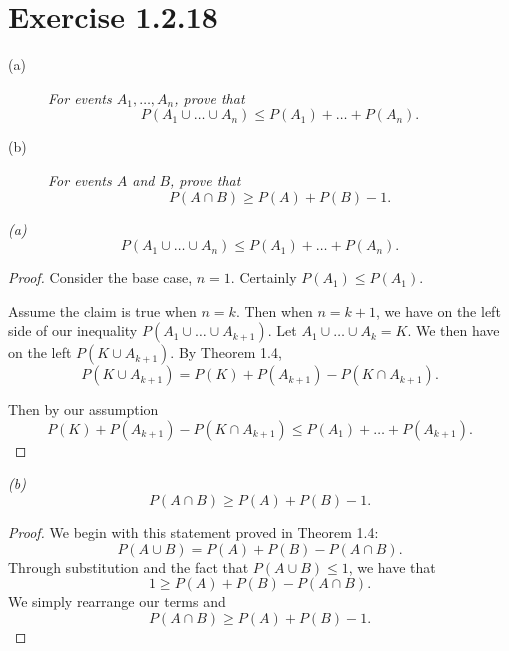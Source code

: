 \documentclass{tufte-handout}
\begin{document}
\section{Exercise 1.2.18}

\begin{description}
\item[(a)] \textit{For events $A_1,\dots, A_n$, prove that
  \[
  P(A_1 \cup \dots \cup A_n) \leq P(A_1) + \dots + P(A_n).
  \]}
\item[(b)] \textit{For events $A$ and $B$, prove that
  \[
  P(A \cap B) \geq P(A) + P(B) - 1.
  \]}
\end{description}

\begin{description}
  \begin{samepage}
  \item[\emph{(a)}]
    \[
    P(A_1 \cup \dots \cup A_n) \leq P(A_1) + \dots + P(A_n).
    \]

    \begin{proof}
      Consider the base case, $n = 1$. Certainly $P(A_1) \leq P(A_1)$.

      Assume the claim is true when $n = k$. Then when $n = k + 1$, we
      have on the left side of our inequality
      $P(A_1 \cup \dots \cup A_{k + 1})$. Let
      $A_1 \cup \dots \cup A_k = K$. We then have on the left
      $P(K \cup A_{k+1})$. By Theorem 1.4, \[ P(K \cup A_{k+1}) = P(K)
      + P(A_{k +1}) - P(K \cap A_{k+1}).\]

      Then by our assumption \[P(K) + P(A_{k+1}) - P(K \cap A_{k+1})
      \leq P(A_1) + \dots + P(A_{k+1}).\]
    \end{proof}
  \end{samepage}

  \begin{samepage}
  \item[\emph{(b)}]
    \[P(A \cap B) \geq P(A) + P(B) - 1.\]

    \begin{proof}
      We begin with this statement proved in Theorem 1.4:
      \[P(A \cup B) = P(A) + P(B) - P(A \cap B).\]
      Through substitution and the fact that $P(A \cup B) \leq 1$, we
      have that
      \[1 \geq P(A) + P(B) - P(A \cap B).\]
      We simply rearrange our terms and
      \[P(A \cap B) \geq P(A) + P(B) - 1.\]
    \end{proof}
  \end{samepage}
\end{description}
\end{document}

